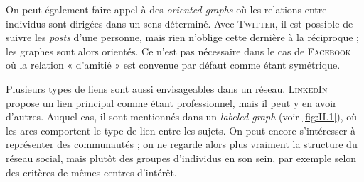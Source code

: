 On peut également faire appel à des \emph{\glspl{oriented-graph}} où les relations entre individus sont dirigées dans un sens déterminé. Avec \textsc{Twitter}, il est possible de suivre les \textit{posts} d'une personne, mais rien n'oblige cette dernière à la réciproque ; les graphes sont alors orientés. Ce n'est pas nécessaire dans le cas de \textsc{Facebook} où la relation « d'amitié » est convenue par défaut comme étant symétrique.

Plusieurs types de liens sont aussi envisageables dans un réseau. \textsc{LinkedIn} propose un lien principal comme étant professionnel, mais il peut y en avoir d'autres. Auquel cas, il sont mentionnés dans un \emph{\gls{labeled-graph}} (voir \cref{fig:II.1}), où les arcs comportent le type de lien entre les sujets.
On peut encore s'intéresser à représenter des communautés ; on ne regarde alors plus vraiment la structure du réseau social, mais plutôt des groupes d'individus en son sein, par exemple selon des critères de mêmes centres d'intérêt. 

